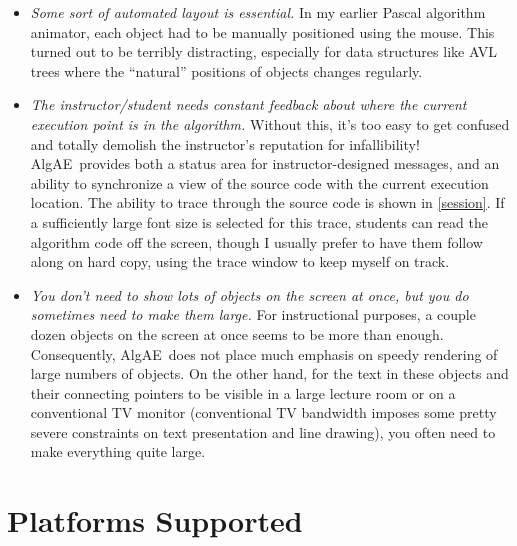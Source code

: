 \documentclass[11pt,titlepage]{book}
\newcommand{\algae}{{\sc AlgAE}}
\begin{document}
\begin{itemize}
\item[] {\em Some sort of automated layout is essential.}  In my
earlier Pascal algorithm animator, each object had to be manually
positioned using the mouse. This turned out to be terribly
distracting, especially for data structures like AVL trees where the
``natural'' positions of objects changes regularly.

\item[] {\em The instructor/student needs constant feedback about where the
current execution point is in the algorithm.} Without this, it's too
easy to get confused and totally demolish the instructor's reputation
for infallibility!  \algae\ provides both a status area for
instructor-designed messages, and an ability to synchronize a view of
the source code with the current execution location.  The ability to
trace through the source code is shown in \autoref{session}. If a
sufficiently large font size is selected for this trace, students can
read the algorithm code off the 
screen, though I usually prefer to have them follow along on hard copy,
using the trace window to keep myself on track.

\item[] {\em You don't need to show lots of objects on the screen at
  once, but you do sometimes need to make them large.} For
  instructional purposes, a couple dozen objects on the screen at once
  seems to be more than enough. Consequently, \algae\ does not place
  much emphasis on speedy rendering of large numbers of objects. On
  the other hand, for the text in these objects and their connecting
  pointers to be visible in a large lecture room or on a conventional
  TV monitor (conventional TV bandwidth imposes some pretty severe
  constraints on text presentation and line drawing), you often need to
  make everything quite large.

\end{itemize}

\section{Platforms Supported}
\end{document}
